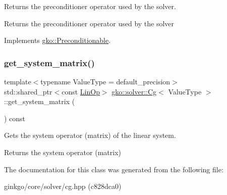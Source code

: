 Returns the preconditioner operator used by the solver. 

\begin{DoxyReturn}{Returns}
the preconditioner operator used by the solver 
\end{DoxyReturn}


Implements \hyperlink{classgko_1_1Preconditionable_ad9545089aef0dfc83bc7a74e5bf1d748}{gko\+::\+Preconditionable}.

\mbox{\label{classgko_1_1solver_1_1Cg_a09d50a99fdc668316757ee253386ad2a}} 
\subsubsection{\texorpdfstring{get\+\_\+system\+\_\+matrix()}{get\_system\_matrix()}}
{\footnotesize\ttfamily template$<$typename Value\+Type  = default\+\_\+precision$>$ \\
std\+::shared\+\_\+ptr$<$const \hyperlink{classgko_1_1LinOp}{Lin\+Op}$>$ \hyperlink{classgko_1_1solver_1_1Cg}{gko\+::solver\+::\+Cg}$<$ Value\+Type $>$\+::get\+\_\+system\+\_\+matrix (\begin{DoxyParamCaption}{ }\end{DoxyParamCaption}) const}



Gets the system operator (matrix) of the linear system. 

\begin{DoxyReturn}{Returns}
the system operator (matrix) 
\end{DoxyReturn}


The documentation for this class was generated from the following file\+:\begin{DoxyCompactItemize}
\item 
ginkgo/core/solver/cg.\+hpp (c828dca0)\end{DoxyCompactItemize}

